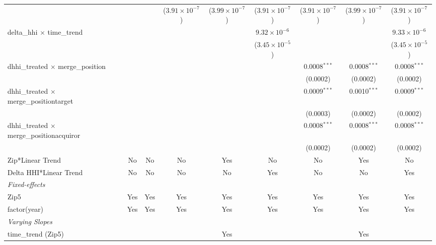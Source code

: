 \begin{table}[H]
{\begin{tabular}{lcccccccc}
   &   &    & ($3.91\times 10^{-7}$) & ($3.99\times 10^{-7}$) & ($3.91\times 10^{-7}$) & ($3.91\times 10^{-7}$) & ($3.99\times 10^{-7}$) & ($3.91\times 10^{-7}$)\\ 

 delta\_hhi $\times $ time\_trend&   &    &    &    & $9.32\times 10^{-6}$ &    &    & $9.33\times 10^{-6}$\\ 

   &   &    &    &    & ($3.45\times 10^{-5}$) &    &    & ($3.45\times 10^{-5}$)\\ 

 dhhi\_treated $\times $ merge\_position&   &    &    &    &    & 0.0008$^{***}$ & 0.0008$^{***}$ & 0.0008$^{***}$\\ 

   &   &    &    &    &    & (0.0002) & (0.0002) & (0.0002)\\ 

 dhhi\_treated $\times $ merge\_positiontarget&   &    &    &    &    & 0.0009$^{***}$ & 0.0010$^{***}$ & 0.0009$^{***}$\\ 

   &   &    &    &    &    & (0.0003) & (0.0002) & (0.0002)\\ 

 dhhi\_treated $\times $ merge\_positionacquiror&   &    &    &    &    & 0.0008$^{***}$ & 0.0008$^{***}$ & 0.0008$^{***}$\\ 

   &   &    &    &    &    & (0.0002) & (0.0002) & (0.0002)\\ 

 Zip*Linear Trend & No & No & No & Yes & No & No & Yes & No\\ 

 Delta HHI*Linear Trend & No & No & No & No & Yes & No & No & Yes\\ 

 \midrule \emph{Fixed-effects}&   &   &   &   &   &   &   &  \\ 

 Zip5 & Yes & Yes & Yes & Yes & Yes & Yes & Yes & Yes\\ 

 factor(year) & Yes & Yes & Yes & Yes & Yes & Yes & Yes & Yes\\ 

 \midrule \emph{Varying Slopes}&   &   &   &   &   &   &   &  \\ 

 time\_trend (Zip5) &  &  &  & Yes &  &  & Yes & \\ 


\end{tabular}}
\end{table}
